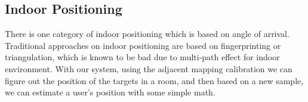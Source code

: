 \subsection{Indoor Positioning}
\label{sec:indoor-positioning}

There is one category of indoor positioning which is based on angle of arrival. Traditional approaches on indoor positioning are based on fingerprinting or triangulation, which is known to be bad due to multi-path effect for indoor environment. With our system, using the adjacent mapping calibration we can figure out the position of the targets in a room, and then based on a new sample, we can estimate a user's position with some simple math.



